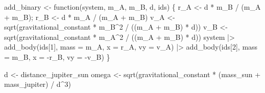 \documentclass[
  10.5pt,
  letterpaper,
]{scrbook}
\newenvironment{Shaded}{\begin{snugshade}}{\end{snugshade}}
\newcommand{\AttributeTok}[1]{\textcolor[rgb]{0.00,0.00,0.00}{#1}}
\newcommand{\ControlFlowTok}[1]{\textcolor[rgb]{0.00,0.00,0.00}{#1}}
\newcommand{\DecValTok}[1]{\textcolor[rgb]{0.00,0.00,0.00}{#1}}
\newcommand{\FunctionTok}[1]{\textcolor[rgb]{0.00,0.00,0.00}{#1}}
\newcommand{\NormalTok}[1]{\textcolor[rgb]{0.00,0.00,0.00}{#1}}
\newcommand{\OtherTok}[1]{\textcolor[rgb]{0.00,0.00,0.00}{#1}}
\newcommand{\SpecialCharTok}[1]{\textcolor[rgb]{0.00,0.00,0.00}{#1}}
\theoremstyle{plain}
\theoremstyle{remark}
\begin{document}
\begin{Shaded}
\begin{Highlighting}[]
\NormalTok{add\_binary }\OtherTok{\textless{}{-}} \ControlFlowTok{function}\NormalTok{(system, m\_A, m\_B, d, ids) \{}
\NormalTok{  r\_A }\OtherTok{\textless{}{-}}\NormalTok{ d }\SpecialCharTok{*}\NormalTok{ m\_B }\SpecialCharTok{/}\NormalTok{ (m\_A }\SpecialCharTok{+}\NormalTok{ m\_B); r\_B }\OtherTok{\textless{}{-}}\NormalTok{ d }\SpecialCharTok{*}\NormalTok{ m\_A }\SpecialCharTok{/}\NormalTok{ (m\_A }\SpecialCharTok{+}\NormalTok{ m\_B)}
\NormalTok{  v\_A }\OtherTok{\textless{}{-}} \FunctionTok{sqrt}\NormalTok{(gravitational\_constant }\SpecialCharTok{*}\NormalTok{ m\_B}\SpecialCharTok{\^{}}\DecValTok{2} \SpecialCharTok{/}\NormalTok{ ((m\_A }\SpecialCharTok{+}\NormalTok{ m\_B) }\SpecialCharTok{*}\NormalTok{ d))}
\NormalTok{  v\_B }\OtherTok{\textless{}{-}} \FunctionTok{sqrt}\NormalTok{(gravitational\_constant }\SpecialCharTok{*}\NormalTok{ m\_A}\SpecialCharTok{\^{}}\DecValTok{2} \SpecialCharTok{/}\NormalTok{ ((m\_A }\SpecialCharTok{+}\NormalTok{ m\_B) }\SpecialCharTok{*}\NormalTok{ d))}
\NormalTok{  system }\SpecialCharTok{|\textgreater{}}
    \FunctionTok{add\_body}\NormalTok{(ids[}\DecValTok{1}\NormalTok{], }\AttributeTok{mass =}\NormalTok{ m\_A, }\AttributeTok{x =}\NormalTok{  r\_A, }\AttributeTok{vy =}\NormalTok{  v\_A) }\SpecialCharTok{|\textgreater{}}
    \FunctionTok{add\_body}\NormalTok{(ids[}\DecValTok{2}\NormalTok{], }\AttributeTok{mass =}\NormalTok{ m\_B, }\AttributeTok{x =} \SpecialCharTok{{-}}\NormalTok{r\_B, }\AttributeTok{vy =} \SpecialCharTok{{-}}\NormalTok{v\_B)}
\NormalTok{\}}

\NormalTok{d     }\OtherTok{\textless{}{-}}\NormalTok{ distance\_jupiter\_sun}
\NormalTok{omega }\OtherTok{\textless{}{-}} \FunctionTok{sqrt}\NormalTok{(gravitational\_constant }\SpecialCharTok{*}\NormalTok{ (mass\_sun }\SpecialCharTok{+}\NormalTok{ mass\_jupiter) }\SpecialCharTok{/}\NormalTok{ d}\SpecialCharTok{\^{}}\DecValTok{3}\NormalTok{)}


\end{Highlighting}
\end{Shaded}
\end{document}
